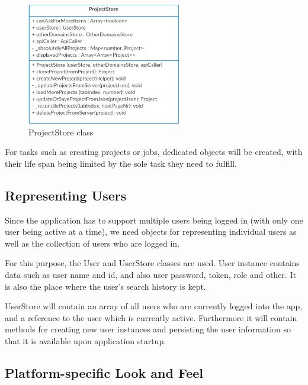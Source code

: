 \begin{figure}[H]
	\includegraphics[width=0.6\textwidth]{pics/ProjectStore}
	\caption{ProjectStore class}
	\label{projectStore}
\end{figure}

For tasks such as creating projects or jobs, dedicated objects will be created, with their life span being limited by the sole task they need to fulfill.

\subsection{Representing Users}

Since the application has to support multiple users being logged in (with only one user being active at a time), we need objects for representing individual users as well as the collection of users who are logged in.

For this purpose, the User and UserStore classes are used. User instance contains data such as user name and id, and also user password, token, role and other. It is also the place where the user's search history is kept.

UserStore will contain an array of all users who are currently logged into the app, and a reference to the user which is currently active. Furthermore it will contain methods for creating new user instances and persisting the user information so that it is available upon application startup.





\subsection{Platform-specific Look and Feel}

